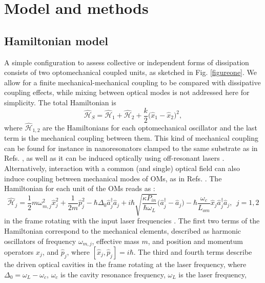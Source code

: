 \documentclass[a4paper]{jpconf}
\begin{document}
\section{Model and methods}
\label{sect2}

\subsection{Hamiltonian model}
 
A simple  configuration to assess collective or independent forms of dissipation consists of two optomechanical coupled units,
as sketched in Fig. \ref{figureone}. We allow for a finite mechanical-mechanical coupling to be compared with
dissipative coupling effects, while mixing between optical modes is not addressed here for simplicity. The total Hamiltonian is
\begin{equation}
\hat{\mathcal{H}}_S=\hat{\mathcal{H}}_1+\hat{\mathcal{H}}_2+\frac{k}{2}\big(\hat
{x}_1-\hat{x}_2\big)^2,
\end{equation}
where $\hat{\mathcal{H}}_{1,2}$ are the Hamiltonians for each optomechanical 
oscillator and the last term is the mechanical coupling between them. 
This kind of mechanical coupling can be found for instance in 
nanoresonators clamped to the same substrate as in Refs. \cite{32,33,cohcop}, as well as it can be induced optically using off-resonant lasers \cite{38}.
 Alternatively, interaction with a common (and single) optical field  can also induce coupling 
between  mechanical modes of OMs, as in Refs. \cite{11,14}.
The Hamiltonian for each unit of the OMs reads as \cite{40}:
\begin{equation} \label{eqHj}
\hat{\mathcal{H}}_j=\frac{1}{2}m\omega_{m,j}^2\hat{x}_j^2+\frac{1}{2m}\hat{p}
_j^2-\hbar\Delta_0\hat{a}^{\dagger}_j\hat{a}_j+i\hbar\sqrt{\frac{\kappa 
P_{in}}{\hbar\omega_{L}}}\big(\hat{a}^{\dagger}_j-\hat{a}_j\big)-\hbar\frac{
\omega_{c}}{L_{om}}\hat{x}_j\hat{a}^{\dagger}_j\hat{a}_j,\ \ j=1,2
\end{equation}
in the frame rotating with the input laser frequencies \cite{1}. The 
first two terms of the Hamiltonian correspond to the mechanical elements, 
described as harmonic oscillators of frequency $\omega_{m,j}$, effective mass 
$m$, and position and momentum operators $\hat{x}_j$, and $\hat{p}_j$, where 
$[\hat{x}_j,\hat{p}_j]=i\hbar$. The third and fourth terms describe the driven 
optical cavities in the frame rotating at the laser frequency, where $\Delta_0=\omega_L-\omega_c$, 
$\omega_c$ is the cavity resonance frequency, $\omega_L$ is the laser frequency, 
\end{document}
